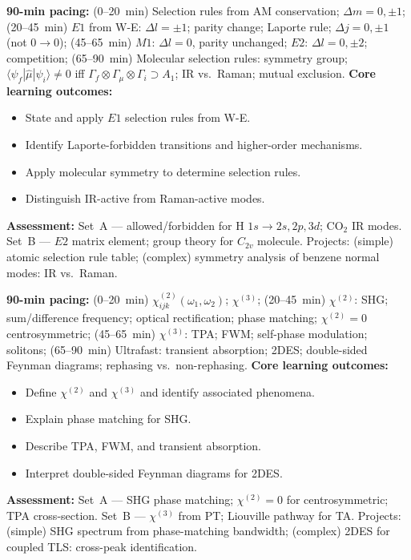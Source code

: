 \documentclass[11pt,a4paper]{article}
\begin{document}
\medskip

\begin{tcolorbox}[modulebox, title={Module~II.6 --- Lecture L07: Selection Rules}]
\textbf{90-min pacing:} (0--20~min) Selection rules from AM conservation; $\Delta m=0,\pm1$; (20--45~min) $E1$ from W-E: $\Delta l=\pm1$; parity change; Laporte rule; $\Delta j=0,\pm1$ (not $0\to0$); (45--65~min) $M1$: $\Delta l=0$, parity unchanged; $E2$: $\Delta l=0,\pm2$; competition; (65--90~min) Molecular selection rules: symmetry group; $\langle\psi_f|\hat\mu|\psi_i\rangle\neq0$ iff $\Gamma_f\otimes\Gamma_\mu\otimes\Gamma_i\supset A_1$; IR vs.\ Raman; mutual exclusion.
\medskip\textbf{Core learning outcomes:}
\begin{itemize}[leftmargin=1.4em,topsep=2pt,itemsep=1pt]
  \item State and apply $E1$ selection rules from W-E.
  \item Identify Laporte-forbidden transitions and higher-order mechanisms.
  \item Apply molecular symmetry to determine selection rules.
  \item Distinguish IR-active from Raman-active modes.
\end{itemize}
\medskip\textbf{Assessment:}
Set~A --- allowed/forbidden for H $1s\to2s,2p,3d$; CO$_2$ IR modes.
Set~B --- $E2$ matrix element; group theory for $C_{2v}$ molecule.
Projects: (simple) atomic selection rule table; (complex) symmetry analysis of benzene normal modes: IR vs.\ Raman.
\end{tcolorbox}

\medskip

\begin{tcolorbox}[modulebox, title={Module~II.6 --- Lecture L08: Non-Linear Response}]
\textbf{90-min pacing:} (0--20~min) $\chi^{(2)}_{ijk}(\omega_1,\omega_2)$; $\chi^{(3)}$; (20--45~min) $\chi^{(2)}$: SHG; sum/difference frequency; optical rectification; phase matching; $\chi^{(2)}=0$ centrosymmetric; (45--65~min) $\chi^{(3)}$: TPA; FWM; self-phase modulation; solitons; (65--90~min) Ultrafast: transient absorption; 2DES; double-sided Feynman diagrams; rephasing vs.\ non-rephasing.
\medskip\textbf{Core learning outcomes:}
\begin{itemize}[leftmargin=1.4em,topsep=2pt,itemsep=1pt]
  \item Define $\chi^{(2)}$ and $\chi^{(3)}$ and identify associated phenomena.
  \item Explain phase matching for SHG.
  \item Describe TPA, FWM, and transient absorption.
  \item Interpret double-sided Feynman diagrams for 2DES.
\end{itemize}
\medskip\textbf{Assessment:}
Set~A --- SHG phase matching; $\chi^{(2)}=0$ for centrosymmetric; TPA cross-section.
Set~B --- $\chi^{(3)}$ from PT; Liouville pathway for TA.
Projects: (simple) SHG spectrum from phase-matching bandwidth; (complex) 2DES for coupled TLS: cross-peak identification.
\end{tcolorbox}
\end{document}
